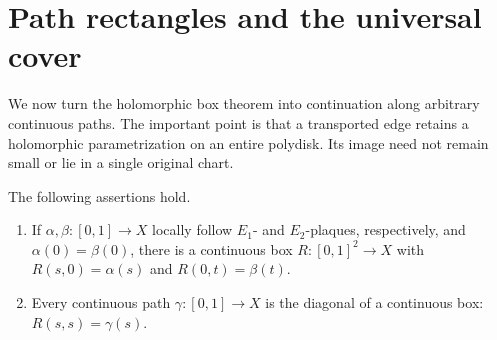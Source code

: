 \section{Path rectangles and the universal cover}\label{sec:global}

We now turn the holomorphic box theorem into continuation along arbitrary
continuous paths. The important point is that a transported edge retains
a holomorphic parametrization on an entire polydisk. Its image need not
remain small or lie in a single original chart.

\begin{proposition}\label{prop:rectangles}
The following assertions hold.
\begin{enumerate}
\item If \(\alpha,\beta:[0,1]\to X\) locally follow \(E_1\)- and
\(E_2\)-plaques, respectively, and \(\alpha(0)=\beta(0)\), there is
a continuous box \(R:[0,1]^2\to X\) with
\(R(s,0)=\alpha(s)\) and \(R(0,t)=\beta(t)\).
\item Every continuous path \(\gamma:[0,1]\to X\) is the diagonal
of a continuous box: \(R(s,s)=\gamma(s)\).
\end{enumerate}
\end{proposition}

